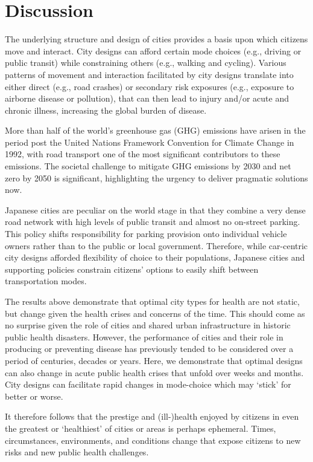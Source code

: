 \documentclass[preprint,12pt]{elsarticle}
\begin{document}
\section*{Discussion}
The underlying structure and design of cities provides a basis upon which citizens move and interact. City designs can afford certain mode choices (e.g., driving or public transit) while constraining others (e.g., walking and cycling). Various patterns of movement and interaction facilitated by city designs translate into either direct (e.g., road crashes) or secondary risk exposures (e.g., exposure to airborne disease or pollution), that can then lead to injury and/or acute and chronic illness, increasing the global burden of disease.

More than half of the world's greenhouse gas (GHG) emissions have arisen in the period post the United Nations Framework Convention for Climate Change in 1992\cite{bashmakov2022climate}, with road transport one of the most significant contributors to these emissions. The societal challenge to mitigate GHG emissions by 2030 and net zero by 2050\cite{lynskey2020moving} is significant, highlighting the urgency to deliver pragmatic solutions now.

Japanese cities are peculiar on the world stage in that they combine a very dense road network with high levels of public transit and almost no on-street parking. This policy shifts responsibility for parking provision onto individual vehicle owners rather than to the public or local government. Therefore, while car-centric city designs afforded flexibility of choice to their populations, Japanese cities and supporting policies constrain citizens' options to easily shift between transportation modes.

The results above demonstrate that optimal city types for health are not static, but change given the health crises and concerns of the time. This should come as no surprise given the role of cities and shared urban infrastructure in historic public health disasters. However, the performance of cities and their role in producing or preventing disease has previously tended to be considered over a period of centuries, decades or years. Here, we demonstrate that optimal designs can also change in acute public health crises that unfold over weeks and months. City designs can facilitate rapid changes in mode-choice which may `stick' for better or worse. 

It therefore follows that the prestige and (ill-)health enjoyed by citizens in even the greatest or `healthiest' of cities or areas is perhaps ephemeral. Times, circumstances, environments, and conditions change that expose citizens to new risks and new public health challenges.
\end{document}
